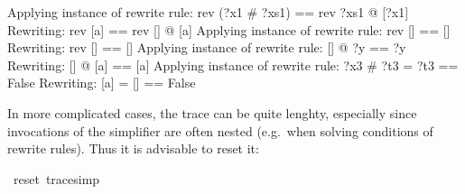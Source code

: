 \begin{isabellebody}
\begin{isamarkuptext}
\begin{ttbox}\makeatother
Applying instance of rewrite rule:
rev (?x1 \# ?xs1) == rev ?xs1 @ [?x1]
Rewriting:
rev [a] == rev [] @ [a]
Applying instance of rewrite rule:
rev [] == []
Rewriting:
rev [] == []
Applying instance of rewrite rule:
[] @ ?y == ?y
Rewriting:
[] @ [a] == [a]
Applying instance of rewrite rule:
?x3 \# ?t3 = ?t3 == False
Rewriting:
[a] = [] == False
\end{ttbox}

In more complicated cases, the trace can be quite lenghty, especially since
invocations of the simplifier are often nested (e.g.\ when solving conditions
of rewrite rules). Thus it is advisable to reset it:%
\end{isamarkuptext}%
\ {\isachardoublequote}reset\ trace{\isacharunderscore}simp{\isachardoublequote}\isanewline
\end{isabellebody}%
